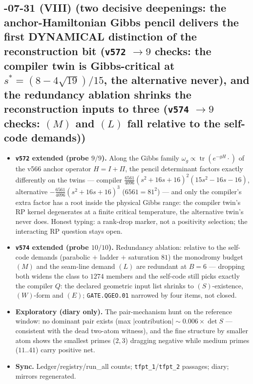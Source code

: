 \documentclass[11pt]{article}
\begin{document}
\subsection*{-07-31 (VIII) (two decisive deepenings: the anchor-Hamiltonian Gibbs pencil delivers the first DYNAMICAL distinction of the reconstruction bit (\texttt{v572} $\to9$ checks: the compiler twin is Gibbs-critical at $s^*=(8-4\sqrt{19})/15$, the alternative never), and the redundancy ablation shrinks the reconstruction inputs to three (\texttt{v574} $\to9$ checks: $(M)$ and $(L)$ fall relative to the self-code demands))}
\begin{itemize}[leftmargin=1.5em]
\item \textbf{\texttt{v572} extended (probe $9/9$).} Along the Gibbs family
$\omega_g\propto\operatorname{tr}(e^{-gH}\cdot)$ of the v566 anchor operator $H=I+\Pi$, the
pencil determinant factors exactly differently on the twins --- compiler
$\tfrac{6561}{4096}(s^2{+}16s{+}16)^2(15s^2{-}16s{-}16)$, alternative
$-\tfrac{6561}{4096}(s^2{+}16s{+}16)^3$ ($6561=81^2$) --- and only the compiler's extra factor
has a root inside the physical Gibbs range: the compiler twin's RP kernel degenerates at a
finite critical temperature, the alternative twin's never does.  Honest typing: a rank-drop
marker, not a positivity selection; the interacting RP question stays open.
\item \textbf{\texttt{v574} extended (probe $10/10$).} Redundancy ablation: relative to the
self-code demands (parabolic $+$ ladder $+$ saturation $81$) the monodromy budget $(M)$ and the
seam-line demand $(L)$ are redundant at $B=6$ --- dropping both widens the class to $1274$
members and the self-code still picks exactly the compiler $Q$: the declared geometric input
list shrinks to $(S)$-existence, $(W)$-form and $(E)$; \texttt{GATE.QGEO.01} narrowed by four
items, not closed.
\item \textbf{Exploratory (diary only).} The pair-mechanism hunt on the reference window: no
dominant pair exists (max $|$contribution$|\sim0.006\times\det S$ --- consistent with the dead
two-atom witness), and the fine structure by smaller atom shows the smallest primes ($2,3$)
dragging negative while medium primes ($11..41$) carry positive net.
\item \textbf{Sync.} Ledger/registry/run\_all counts; \texttt{tfpt\_1}/\texttt{tfpt\_2}
passages; diary; mirrors regenerated.
\end{itemize}
\end{document}
